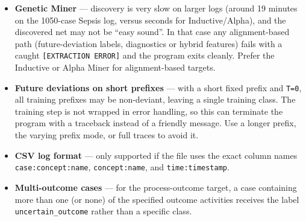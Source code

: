 \documentclass[12pt,a4paper]{article}
\begin{document}
\begin{itemize}
    \item \textbf{Genetic Miner} --- discovery is very slow on larger logs (around 19 minutes on the 1050-case Sepsis log, versus seconds for Inductive/Alpha), and the discovered net may not be ``easy sound''. In that case any alignment-based path (future-deviation labels, diagnostics or hybrid features) fails with a caught \verb|[EXTRACTION ERROR]| and the program exits cleanly. Prefer the Inductive or Alpha Miner for alignment-based targets.
    \item \textbf{Future deviations on short prefixes} --- with a short fixed prefix and \texttt{T=0}, all training prefixes may be non-deviant, leaving a single training class. The training step is not wrapped in error handling, so this can terminate the program with a traceback instead of a friendly message. Use a longer prefix, the varying prefix mode, or full traces to avoid it.
    \item \textbf{CSV log format} --- only supported if the file uses the exact column names \verb|case:concept:name|, \verb|concept:name|, and \verb|time:timestamp|.
    \item \textbf{Multi-outcome cases} --- for the process-outcome target, a case containing more than one (or none) of the specified outcome activities receives the label \verb|uncertain_outcome| rather than a specific class.
\end{itemize}
\end{document}
